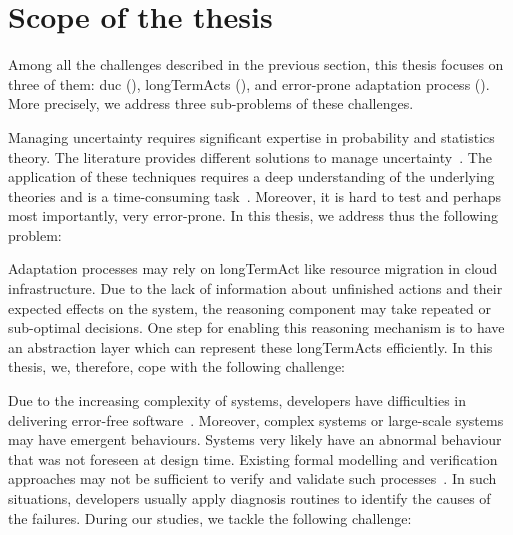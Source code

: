 \section{Scope of the thesis}
\label{sec:intro:scope}

Among all the challenges described in the previous section, this thesis focuses on three of them: \gls{duc} (), \glspl{longTermAct} (), and error-prone adaptation process ().
More precisely, we address three sub-problems of these challenges.

Managing uncertainty requires significant expertise in probability and statistics theory.
The literature provides different solutions to manage uncertainty~\cite{zadeh1996fuzzy,metrology2008evaluation,shafer1992dempster}.
The application of these techniques requires a deep understanding of the underlying theories and is a time-consuming task~\cite{DBLP:conf/quatic/VallecilloMO16}.
Moreover, it is hard to test and perhaps most importantly, very error-prone.
In this thesis, we address thus the following problem:
\vspace{-2em}

Adaptation processes may rely on \gls{longTermAct} like resource migration in cloud infrastructure.
Due to the lack of information about unfinished actions and their expected effects on the system, the reasoning component may take repeated or sub-optimal decisions.
One step for enabling this reasoning mechanism is to have an abstraction layer which can represent these \glspl{longTermAct} efficiently.
In this thesis, we, therefore, cope with the following challenge:
\vspace{-2em}

Due to the increasing complexity of systems, developers have difficulties in delivering error-free software~\cite{DBLP:conf/icse/BarbosaLMJ17, DBLP:conf/icse/MongielloPS15, DBLP:conf/icse/HassanBB15}.
Moreover, complex systems or large-scale systems may have emergent behaviours.
Systems very likely have an abnormal behaviour that was not foreseen at design time.
Existing formal modelling and verification approaches may not be sufficient to verify and validate such processes~\cite{DBLP:conf/icse/TaharaOH17}.
In such situations, developers usually apply diagnosis routines to identify the causes of the failures.
During our studies, we tackle the following challenge:
\vspace{-2em}

